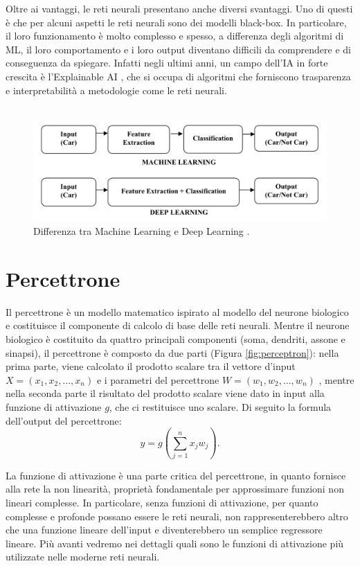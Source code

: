 Oltre ai vantaggi, le reti neurali presentano anche diversi svantaggi. Uno di questi è che per alcuni aspetti le reti neurali sono dei modelli black-box. In particolare, il loro funzionamento è molto complesso e spesso, a differenza degli algoritmi di ML, il loro comportamento e i loro output diventano difficili da comprendere e di conseguenza da spiegare. Infatti negli ultimi anni, un campo dell'IA in forte crescita è l'Explainable AI \cite{expai}, che si occupa di algoritmi che forniscono trasparenza e interpretabilità a metodologie come le reti neurali.
\\ \\
\begin{figure}[h!]
    \centering
    \includegraphics[scale=0.5]{img/ML_vs_DL.png}
    \caption{Differenza tra Machine Learning e Deep Learning \cite{dlsurvey2}.}
    \label{fig:ML_vs_DL}
\end{figure}




\section{Percettrone}
Il percettrone è un modello matematico ispirato al modello del neurone biologico \cite{rosenblatt1958perceptron} e costituisce il componente di calcolo di base delle reti neurali. Mentre il neurone biologico è costituito da quattro principali componenti (soma, dendriti, assone e sinapsi), il percettrone è composto da due parti (Figura \ref{fig:perceptron}): nella prima parte, viene calcolato il prodotto scalare tra il vettore d’input $X = (x_{1}, x_{2}, ..., x_{n})$ e i parametri del percettrone $W = (w_{1}, w_{2}, ..., w_{n})$ , mentre nella seconda parte il risultato del prodotto scalare viene dato in input alla funzione di attivazione $g$, che ci restituisce uno scalare. Di seguito la formula dell'output del percettrone:
\begin{equation}
    y = g( \sum_{j=1}^{n}{x_{j}w_{j}} ).
\end{equation}


La funzione di attivazione è una parte critica del percettrone, in quanto fornisce alla rete la non linearità, proprietà fondamentale per approssimare funzioni non lineari complesse. In particolare, senza funzioni di attivazione, per quanto complesse e profonde  possano essere le reti neurali, non rappresenterebbero altro che una funzione lineare dell’input e diventerebbero un semplice regressore lineare. Più avanti vedremo nei dettagli quali sono le funzioni di attivazione più utilizzate nelle moderne reti neurali.\\ \\

